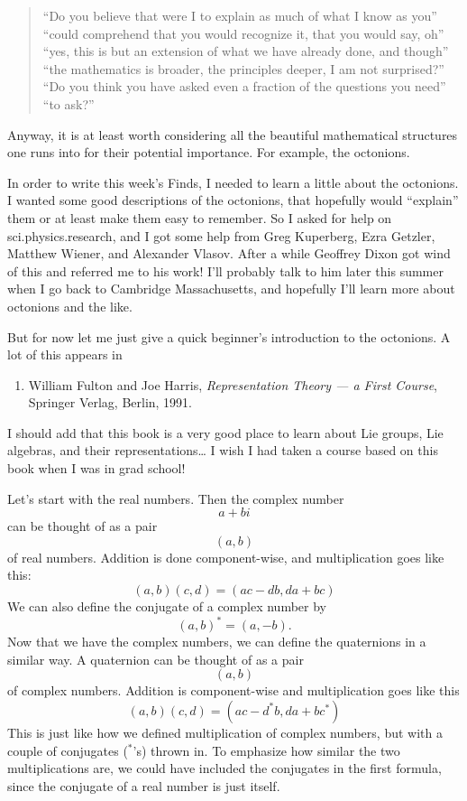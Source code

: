 \documentclass{article}
\def\tightlist{}
\begin{document}
\begin{quote}
``Do you believe that were I to explain as much of what I know as you''
``could comprehend that you would recognize it, that you would say, oh''
``yes, this is but an extension of what we have already done, and
though'' ``the mathematics is broader, the principles deeper, I am not
surprised?'' ``Do you think you have asked even a fraction of the
questions you need'' ``to ask?''
\end{quote}

Anyway, it is at least worth considering all the beautiful mathematical
structures one runs into for their potential importance. For example,
the octonions.

In order to write this week's Finds, I needed to learn a little about
the octonions. I wanted some good descriptions of the octonions, that
hopefully would ``explain'' them or at least make them easy to remember.
So I asked for help on sci.physics.research, and I got some help from
Greg Kuperberg, Ezra Getzler, Matthew Wiener, and Alexander Vlasov.
After a while Geoffrey Dixon got wind of this and referred me to his
work! I'll probably talk to him later this summer when I go back to
Cambridge Massachusetts, and hopefully I'll learn more about octonions
and the like.

But for now let me just give a quick beginner's introduction to the
octonions. A lot of this appears in

\begin{enumerate}
\def\labelenumi{\arabic{enumi})}
\setcounter{enumi}{1}
\tightlist
\item
  William Fulton and Joe Harris, \emph{Representation Theory --- a First
  Course}, Springer Verlag, Berlin, 1991.
\end{enumerate}

I should add that this book is a very good place to learn about Lie
groups, Lie algebras, and their representations\ldots{} I wish I had
taken a course based on this book when I was in grad school!

Let's start with the real numbers. Then the complex number \[a+bi\] can
be thought of as a pair \[(a,b)\] of real numbers. Addition is done
component-wise, and multiplication goes like this:
\[(a,b)(c,d) = (ac - db,da + bc)\] We can also define the conjugate of a
complex number by \[(a,b)^* = (a,-b).\] Now that we have the complex
numbers, we can define the quaternions in a similar way. A quaternion
can be thought of as a pair \[(a,b)\] of complex numbers. Addition is
component-wise and multiplication goes like this
\[(a,b)(c,d) = (ac - d^*b, da + bc^*)\] This is just like how we defined
multiplication of complex numbers, but with a couple of conjugates
(\({}^*\)'s) thrown in. To emphasize how similar the two multiplications
are, we could have included the conjugates in the first formula, since
the conjugate of a real number is just itself.
\end{document}
